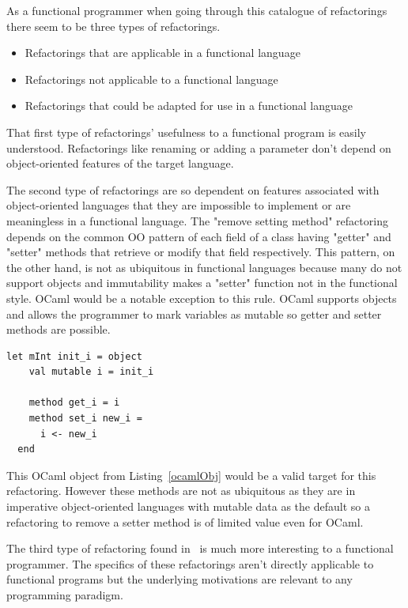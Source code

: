 As a functional programmer when going through this catalogue of refactorings there seem to be three types of refactorings.

\begin{itemize}
	\item Refactorings that are applicable in a functional language
	\item Refactorings not applicable to a functional language
	\item Refactorings that could be adapted for use in a functional language
\end{itemize}

That first type of refactorings' usefulness to a functional program is easily understood. Refactorings like renaming or adding a parameter don't depend on object-oriented features of the target language. 

The second type of refactorings are so dependent on features associated with object-oriented languages that they are impossible to implement or are meaningless in a functional language. The "remove setting method" refactoring depends on the common OO pattern of each field of a class having "getter" and "setter" methods that retrieve or modify that field respectively. This pattern, on the other hand, is not as ubiquitous in functional languages because many do not support objects and immutability makes a "setter" function not in the functional style. OCaml would be a notable exception to this rule. OCaml supports objects and allows the programmer to mark variables as mutable so getter and setter methods are possible.

\begin{lstlisting}[caption={An OCaml object with getter and setter methods.},captionpos=b, language=caml, morekeywords={object,method},label=ocamlObj]
let mInt init_i = object
    val mutable i = init_i

    method get_i = i
    method set_i new_i =
      i <- new_i
  end
\end{lstlisting}

This OCaml object from Listing~\ref{ocamlObj} would be a valid target for this refactoring. However these methods are not as ubiquitous as they are in imperative object-oriented languages with mutable data as the default so a refactoring to remove a setter method is of limited value even for OCaml.

The third type of refactoring found in~\citep{fowler} is much more interesting to a functional programmer. The specifics of these refactorings aren't directly applicable to functional programs but the underlying motivations are relevant to any programming paradigm. 

